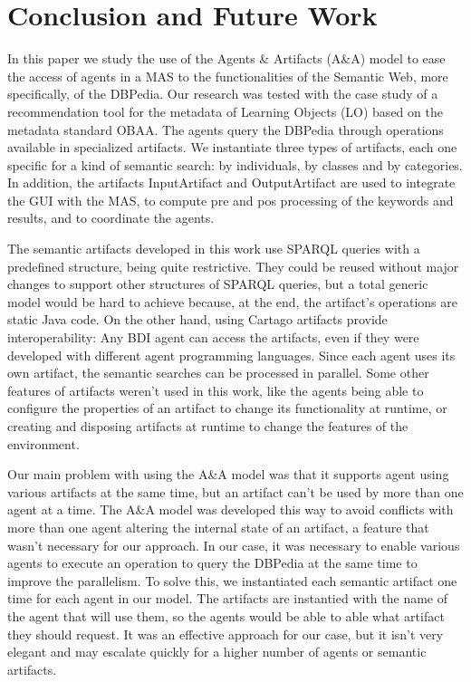 \documentclass[a4paper,twoside]{article}
\begin{document}
\section{Conclusion and Future Work}

\noindent In this paper we study the use of the Agents \& Artifacts (A\&A) model to ease the access of agents in a MAS to the functionalities of the Semantic Web, more specifically, of the DBPedia. Our research was tested with the case study of a recommendation tool for the metadata of Learning Objects (LO) based on the metadata standard OBAA. The agents query the DBPedia through operations available in specialized artifacts. We instantiate three types of artifacts, each one specific for a kind of semantic search: by individuals, by classes and by categories. In addition, the artifacts InputArtifact and OutputArtifact are used to integrate the GUI with the MAS, to compute pre and pos processing of the keywords and results, and to coordinate the agents.

The semantic artifacts developed in this work use SPARQL queries with a predefined structure, being quite restrictive. They could be reused without major changes to support other structures of SPARQL queries, but a total generic model would be hard to achieve because, at the end, the artifact's operations are static Java code. On the other hand, using Cartago artifacts provide interoperability: Any BDI agent can access the artifacts, even if they were developed with different agent programming languages. Since each agent uses its own artifact, the semantic searches can be processed in parallel. Some other features of artifacts weren't used in this work, like the agents being able to configure the properties of an artifact to change its functionality at runtime, or creating and disposing artifacts at runtime to change the features of the environment.

Our main problem with using the A\&A model was that it supports agent using various artifacts at the same time, but an artifact can't be used by more than one agent at a time. The A\&A model was developed this way to avoid conflicts with more than one agent altering the internal state of an artifact, a feature that wasn't necessary for our approach. In our case, it was necessary to enable various agents to execute an operation to query the DBPedia at the same time to improve the parallelism. To solve this, we instantiated each semantic artifact one time for each agent in our model. The artifacts are instantied with the name of the agent that will use them, so the agents would be able to able what artifact they should request. It was an effective approach for our case, but it isn't very elegant and may escalate quickly for a higher number of agents or semantic artifacts.
\end{document}
